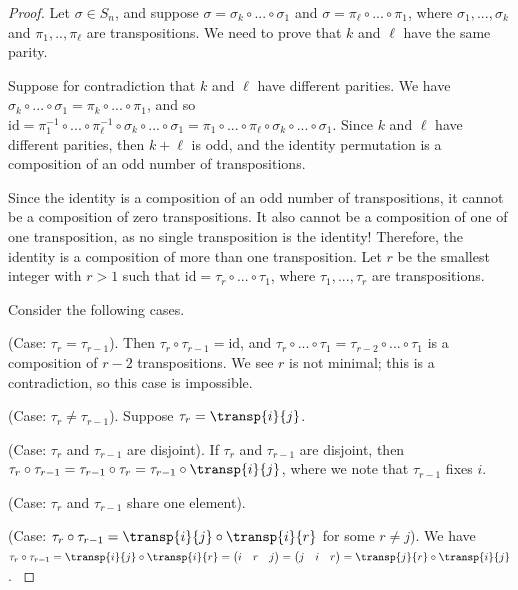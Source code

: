 \begin{proof}
    Let $\sigma \in S_n$, and suppose $\sigma = \sigma_k \circ ... \circ \sigma_1$ and $\sigma = \pi_\ell \circ ... \circ \pi_1$, where $\sigma_1, ..., \sigma_k$ and $\pi_1, .., \pi_\ell$ are transpositions. We need to prove that $k$ and $\ell$ have the same parity.
    
    Suppose for contradiction that $k$ and $\ell$ have different parities. We have $\sigma_k \circ ... \circ \sigma_1 = \pi_k \circ ... \circ \pi_1$, and so $\text{id} = \pi_1^{-1} \circ ... \circ \pi_\ell^{-1} \circ \sigma_k \circ ... \circ \sigma_1 = \pi_1 \circ ... \circ \pi_\ell \circ \sigma_k \circ ... \circ \sigma_1$. Since $k$ and $\ell$ have different parities, then  $k + \ell$ is odd, and the identity permutation is a composition of an odd number of transpositions.
    
    Since the identity is a composition of an odd number of transpositions, it cannot be a composition of zero transpositions. It also cannot be a composition of one of one transposition, as no single transposition is the identity! Therefore, the identity is a composition of more than one transposition. Let $r$ be the smallest integer with $r > 1$ such that $\text{id} = \tau_r \circ ... \circ \tau_1$, where $\tau_1, ..., \tau_r$ are transpositions.
    
    Consider the following cases.

    (Case: $\tau_r = \tau_{r - 1}$). Then $\tau_r \circ \tau_{r - 1} = \text{id}$, and $\tau_r \circ ... \circ \tau_1 = \tau_{r - 2} \circ ... \circ \tau_1$ is a composition of $r - 2$ transpositions. We see $r$ is not minimal; this is a contradiction, so this case is impossible.

    (Case: $\tau_r \neq \tau_{r - 1}$). Suppose $\tau_r = \transp{i}{j}$.
    
    \fullindent
    {
        (Case: $\tau_r$ and $\tau_{r - 1}$ are disjoint). If $\tau_r$ and $\tau_{r - 1}$ are disjoint, then $\tau_r \circ \tau_{r - 1} = \tau_{r - 1} \circ \tau_r = \tau_{r - 1} \circ \transp{i}{j}$, where we note that $\tau_{r - 1}$ fixes $i$.
    
        (Case: $\tau_r$ and $\tau_{r - 1}$ share one element).
    
        \fullindent
        {
            \fullindent
            {
                (Case: $\tau_r \circ \tau_{r - 1} = \transp{i}{j} \circ \transp{i}{r}$ for some $r \neq j$). We have $\tau_r \circ \tau_{r - 1} = \transp{i}{j} \circ \transp{i}{r} = \begin{pmatrix} i & r & j \end{pmatrix} = \begin{pmatrix} j & i & r \end{pmatrix} = \transp{j}{r} \circ \transp{i}{j}$. 
            }

}}
\end{proof}

